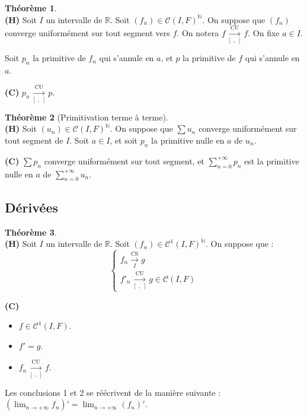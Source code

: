 \documentclass[12pt]{book}
\let\ensembleNombre\mathbb
\newcommand*\N{\ensuremath{\ensembleNombre{N}}}
\newcommand*\R{\ensuremath{\ensembleNombre{R}}}
\newcommand{\ls}[1]{\ensuremath{\overset{\mathrm{CS}}{\underset{#1}{\longrightarrow}}}}
\newcommand{\lu}[1]{\ensuremath{\overset{\mathrm{CU}}{\underset{#1}{\longrightarrow}}}}
\newcommand{\lusts}{\lu{[\; , \;]}}
\theoremstyle{definition}
\newtheorem{thme}{Théorème}[chapter]
\theoremstyle{remark}
\newenvironment{fthme}
  {\begin{mdframed}[roundcorner=10pt, linewidth=2pt]\begin{thme}}
  {\end{thme}\end{mdframed}}
\begin{document}
	\begin{fthme}\mbox{~}\\
	\textbf{(H)} Soit $I$ un intervalle de $\R$. Soit $(f_n) \in \mathcal C(I, F)^\N$. On suppose que $(f_n)$ converge uniformément sur tout segment vers $f$. On notera $f \lusts f$. On fixe $a \in I$. 
	
	Soit $p_n$ la primitive de $f_n$ qui s'annule en $a$, et $p$ la primitive de $f$ qui s'annule en $a$.
	
	\noindent \textbf{(C)} $p_n \lusts p$.
	\end{fthme}
	
	\begin{fthme}[Primitivation terme à terme]\mbox{~}\\
	\textbf{(H)} Soit $(u_n) \in \mathcal C(I,F)^\N$. On suppose que $\sum u_n$ converge uniformément sur tout segment de $I$. Soit $a \in I$, et soit $p_n$ la primitive nulle en $a$ de $u_n$.
	
	\noindent \textbf{(C)} $\sum p_n$ converge uniformément sur tout segment, et $\sum_{n=0}^{+\infty} p_n$ est la primitive nulle en $a$ de $\sum_{n=0}^{+\infty} u_n$.
	\end{fthme}
	
		\subsection{Dérivées}
	\begin{fthme}\mbox{~}\\
	\textbf{(H)} Soit $I$ un intervalle de $\R$. Soit $(f_n) \in \mathcal C^1(I,F)^\N$. On suppose que :
	\[\begin{cases}
		f_n \ls{I} g\\
		f'_n \lusts g \in \mathcal C(I,F)
	  \end{cases}\]
	  
	\noindent \textbf{(C)} \begin{itemize}
	\item[1)] $f \in \mathcal C^1(I,F)$.
	\item[2)] $f' = g$.
	\item[3)] $f_n \lusts f$.
	\end{itemize}
	
	Les conclusions 1 et 2 se réécrivent de la manière suivante : $\left( \lim_{n\to +\infty} f_n \right)' = \lim_{n\to +\infty} (f_n)'$.
	\end{fthme}
	
\end{document}
